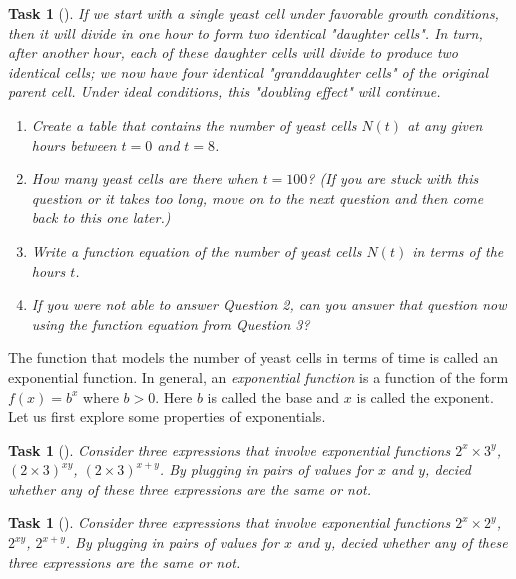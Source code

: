 \documentclass[10pt,]{article}
\theoremstyle{plain}
\newtheorem{proposition}[theorem]{Task}
\theoremstyle{definition}
\numberwithin{equation}{section}
\newcommand{\gt}{>}
\begin{document}
\begin{proposition}[{}]\label{proposition-11}
\hypertarget{p-63}{}%
If we start with a single yeast cell under favorable growth conditions, then it will divide in one hour to form two identical "daughter cells". In turn, after another hour, each of these daughter cells will divide to produce two identical cells; we now have four identical "granddaughter cells" of the original parent cell. Under ideal conditions, this "doubling effect" will continue.%
\leavevmode%
\begin{enumerate}
\item\hypertarget{li-106}{}Create a table that contains the number of yeast cells \(N(t)\) at any given hours between \(t=0\) and \(t=8\).%
\item\hypertarget{li-107}{}How many yeast cells are there when \(t=100\)? (If you are stuck with this question or it takes too long, move on to the next question and then come back to this one later.)%
\item\hypertarget{li-108}{}Write a function equation of the number of yeast cells \(N(t)\) in terms of the hours \(t\).%
\item\hypertarget{li-109}{}If you were not able to answer Question 2, can you answer that question now using the function equation from Question 3?%
\end{enumerate}
\end{proposition}
\hypertarget{p-64}{}%
The function that models the number of yeast cells in terms of time is called an exponential function. In general, an \emph{exponential function} is a function of the form \(f(x)=b^x\) where \(b\gt0\). Here \(b\) is called the base and \(x\) is called the exponent. Let us first explore some properties of exponentials.%
\begin{proposition}[{}]\label{proposition-12}
\hypertarget{p-65}{}%
Consider three expressions that involve exponential functions \(2^x \times 3^y\), \((2 \times 3)^{xy}\), \((2 \times 3)^{x+y}\). By plugging in pairs of values for \(x\) and \(y\), decied whether any of these three expressions are the same or not.%
\end{proposition}
\begin{proposition}[{}]\label{proposition-13}
\hypertarget{p-66}{}%
Consider three expressions that involve exponential functions \(2^x \times 2^y\), \(2^{xy}\), \(2^{x+y}\). By plugging in pairs of values for \(x\) and \(y\), decied whether any of these three expressions are the same or not.%
\end{proposition}
\end{document}
